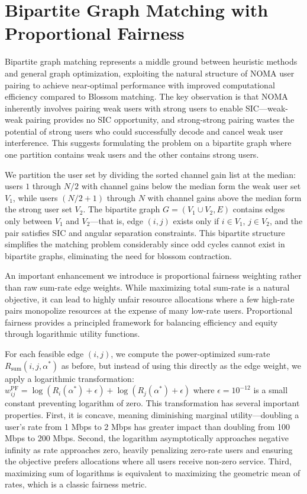 \section{Bipartite Graph Matching with Proportional Fairness}

Bipartite graph matching represents a middle ground between heuristic methods and general graph optimization, exploiting the natural structure of NOMA user pairing to achieve near-optimal performance with improved computational efficiency compared to Blossom matching. The key observation is that NOMA inherently involves pairing weak users with strong users to enable SIC—weak-weak pairing provides no SIC opportunity, and strong-strong pairing wastes the potential of strong users who could successfully decode and cancel weak user interference. This suggests formulating the problem on a bipartite graph where one partition contains weak users and the other contains strong users.

We partition the user set by dividing the sorted channel gain list at the median: users $1$ through $N/2$ with channel gains below the median form the weak user set $V_1$, while users $(N/2 + 1)$ through $N$ with channel gains above the median form the strong user set $V_2$. The bipartite graph $G = (V_1 \cup V_2, E)$ contains edges only between $V_1$ and $V_2$—that is, edge $(i,j)$ exists only if $i \in V_1$, $j \in V_2$, and the pair satisfies SIC and angular separation constraints. This bipartite structure simplifies the matching problem considerably since odd cycles cannot exist in bipartite graphs, eliminating the need for blossom contraction.

An important enhancement we introduce is proportional fairness weighting rather than raw sum-rate edge weights. While maximizing total sum-rate is a natural objective, it can lead to highly unfair resource allocations where a few high-rate pairs monopolize resources at the expense of many low-rate users. Proportional fairness provides a principled framework for balancing efficiency and equity through logarithmic utility functions.

For each feasible edge $(i,j)$, we compute the power-optimized sum-rate $R_{\text{sum}}(i,j,\alpha^*)$ as before, but instead of using this directly as the edge weight, we apply a logarithmic transformation: $w_{ij}^{\text{PF}} = \log(R_i(\alpha^*) + \epsilon) + \log(R_j(\alpha^*) + \epsilon)$ where $\epsilon = 10^{-12}$ is a small constant preventing logarithm of zero. This transformation has several important properties. First, it is concave, meaning diminishing marginal utility—doubling a user's rate from 1 Mbps to 2 Mbps has greater impact than doubling from 100 Mbps to 200 Mbps. Second, the logarithm asymptotically approaches negative infinity as rate approaches zero, heavily penalizing zero-rate users and ensuring the objective prefers allocations where all users receive non-zero service. Third, maximizing sum of logarithms is equivalent to maximizing the geometric mean of rates, which is a classic fairness metric.

